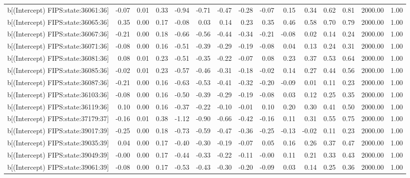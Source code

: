 \begin{table}[ht]
\begin{tabular}{rrrrrrrrrrrrrrr}
  b[(Intercept) FIPS:state:36061:36] & -0.07 & 0.01 & 0.33 & -0.94 & -0.71 & -0.47 & -0.28 & -0.07 & 0.15 & 0.34 & 0.62 & 0.81 & 2000.00 & 1.00 \\ 
  b[(Intercept) FIPS:state:36065:36] & 0.35 & 0.00 & 0.17 & -0.08 & 0.03 & 0.14 & 0.23 & 0.35 & 0.46 & 0.58 & 0.70 & 0.79 & 2000.00 & 1.00 \\ 
  b[(Intercept) FIPS:state:36067:36] & -0.21 & 0.00 & 0.18 & -0.66 & -0.56 & -0.44 & -0.34 & -0.21 & -0.08 & 0.02 & 0.14 & 0.24 & 2000.00 & 1.00 \\ 
  b[(Intercept) FIPS:state:36071:36] & -0.08 & 0.00 & 0.16 & -0.51 & -0.39 & -0.29 & -0.19 & -0.08 & 0.04 & 0.13 & 0.24 & 0.31 & 2000.00 & 1.00 \\ 
  b[(Intercept) FIPS:state:36081:36] & 0.08 & 0.01 & 0.23 & -0.51 & -0.35 & -0.22 & -0.07 & 0.08 & 0.23 & 0.37 & 0.53 & 0.64 & 2000.00 & 1.00 \\ 
  b[(Intercept) FIPS:state:36085:36] & -0.02 & 0.01 & 0.23 & -0.57 & -0.46 & -0.31 & -0.18 & -0.02 & 0.14 & 0.27 & 0.44 & 0.56 & 2000.00 & 1.00 \\ 
  b[(Intercept) FIPS:state:36087:36] & -0.21 & 0.00 & 0.16 & -0.63 & -0.53 & -0.41 & -0.32 & -0.20 & -0.09 & 0.01 & 0.11 & 0.23 & 2000.00 & 1.00 \\ 
  b[(Intercept) FIPS:state:36103:36] & -0.08 & 0.00 & 0.16 & -0.50 & -0.39 & -0.29 & -0.19 & -0.08 & 0.03 & 0.12 & 0.25 & 0.35 & 2000.00 & 1.00 \\ 
  b[(Intercept) FIPS:state:36119:36] & 0.10 & 0.00 & 0.16 & -0.37 & -0.22 & -0.10 & -0.01 & 0.10 & 0.20 & 0.30 & 0.41 & 0.50 & 2000.00 & 1.00 \\ 
  b[(Intercept) FIPS:state:37179:37] & -0.16 & 0.01 & 0.38 & -1.12 & -0.90 & -0.66 & -0.42 & -0.16 & 0.11 & 0.31 & 0.55 & 0.75 & 2000.00 & 1.00 \\ 
  b[(Intercept) FIPS:state:39017:39] & -0.25 & 0.00 & 0.18 & -0.73 & -0.59 & -0.47 & -0.36 & -0.25 & -0.13 & -0.02 & 0.11 & 0.23 & 2000.00 & 1.00 \\ 
  b[(Intercept) FIPS:state:39035:39] & 0.04 & 0.00 & 0.17 & -0.40 & -0.30 & -0.19 & -0.07 & 0.05 & 0.16 & 0.26 & 0.37 & 0.47 & 2000.00 & 1.00 \\ 
  b[(Intercept) FIPS:state:39049:39] & -0.00 & 0.00 & 0.17 & -0.44 & -0.33 & -0.22 & -0.11 & -0.00 & 0.11 & 0.21 & 0.33 & 0.43 & 2000.00 & 1.00 \\ 
  b[(Intercept) FIPS:state:39061:39] & -0.08 & 0.00 & 0.17 & -0.53 & -0.43 & -0.30 & -0.20 & -0.09 & 0.03 & 0.14 & 0.25 & 0.36 & 2000.00 & 1.00 \\ 

\end{tabular}
\end{table}
